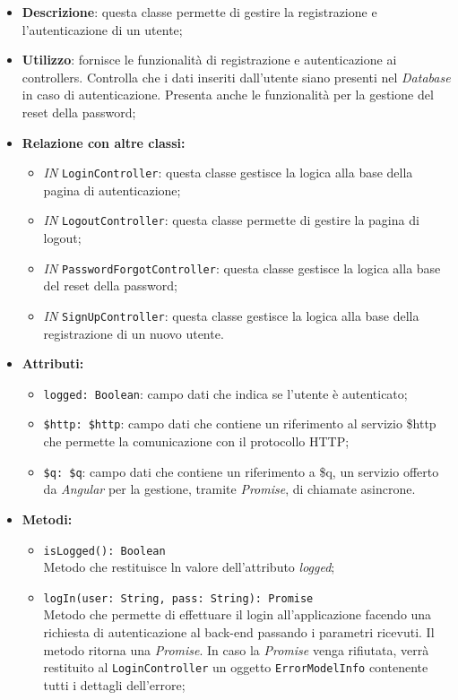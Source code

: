 \begin{itemize}
	\item \textbf{Descrizione}: questa classe permette di gestire la registrazione e l'autenticazione di un utente;
	\item \textbf{Utilizzo}: fornisce le funzionalità di registrazione e autenticazione ai controllers. Controlla che i dati inseriti dall'utente siano presenti nel \textit{Database} in caso di autenticazione. Presenta anche le funzionalità per la gestione del reset della password;
	\item \textbf{Relazione con altre classi:}
	\begin{itemize}
		\item \textit{IN} \texttt{LoginController}: questa classe gestisce la logica alla base della pagina di autenticazione;
		\item \textit{IN} \texttt{LogoutController}: questa classe permette di gestire la pagina di logout;
		\item \textit{IN} \texttt{PasswordForgotController}: questa classe gestisce la logica alla base del reset della password;
		\item \textit{IN} \texttt{SignUpController}: questa classe gestisce la logica alla base della registrazione di un nuovo utente.
	\end{itemize}
	\item \textbf{Attributi:}
	\begin{itemize}
		\item \texttt{logged: Boolean}: campo dati che indica se l'utente è autenticato;
		\item \texttt{\$http: \$http}: campo dati che contiene un riferimento al servizio \$http che permette la comunicazione con il protocollo HTTP;
		\item \texttt{\$q: \$q}: campo dati che contiene un riferimento a \$q, un servizio offerto da \textit{Angular} per la gestione, tramite \textit{Promise}, di chiamate asincrone.
	\end{itemize}
	\item \textbf{Metodi:}
	\begin{itemize}
		\item \texttt{isLogged(): Boolean} \\ Metodo che restituisce ln valore dell'attributo \textit{logged};
		\item \texttt{logIn(user: String, pass: String): Promise}\\ Metodo che permette di effettuare il login all'applicazione facendo una richiesta di autenticazione al back-end passando i parametri ricevuti. Il metodo ritorna una \textit{Promise}. In caso la \textit{Promise} venga rifiutata, verrà restituito al \texttt{LoginController} un oggetto \texttt{ErrorModelInfo} contenente tutti i dettagli dell'errore; \\

\end{itemize}
\end{itemize}
